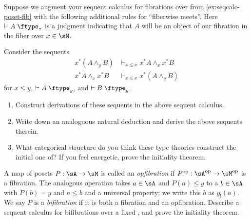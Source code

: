 \documentclass{book}
\let\types\vdash
\def\type{\;\ftype}
\let\meet\wedge
\begin{document}
\begin{ex}\label{ex:mslat-fib}
  Suppose we augment your sequent calculus for fibrations over \sM from \cref{ex:seqcalc-poset-fib} with the following additional rules for ``fiberwise meets''.
  Here $\types A\type_x$ is a judgment indicating that $A$ will be an object of our fibration in the fiber over $x\in\sM$.
  Consider the sequents
  \begin{align*}
    x^*(A\meet_y B) &\types_{x\le x} x^*A \meet_x x^*B\\
    x^*A \meet_x x^*B &\types_{x\le x} x^*(A\meet_y B)
  \end{align*}
  for $x\le y$, $\types A\type_y$, and $\types B\type_y$.
  \begin{enumerate}
  \item Construct derivations of these sequents in the above sequent calculus.
  \item Write down an analoguous natural deduction and derive the above sequents therein.
  \item What categorical structure do you think these type theories construct the initial one of?
    If you feel energetic, prove the initiality theorem.
  \end{enumerate}
\end{ex}

\begin{ex}\label{ex:poset-bifib}
  A map of posets $P:\sA\to\sM$ is called an \emph{opfibration} if $P\op:\sA\op\to\sM\op$ is a fibration.
  The analogous operation takes $a\in \sA$ and $P(a)\le y$ to a $b\in \sA$ with $P(b)=y$ and $a\le b$ and a universal property; we write this $b$ as $y_!(a)$.
  We say $P$ is a \emph{bifibration} if it is both a fibration and an opfibration.
  Describe a sequent calculus for bifibrations over a fixed \sM, and prove the initiality theorem.
\end{ex}
\end{document}
